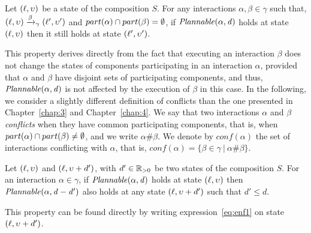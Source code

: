 \begin{property}\label{pt:plnIn1}
Let $(\ell,\upsilon)$ be a state of the composition $S$. For any interactions $\alpha,\beta\in\gamma$
such that, $(\ell,\upsilon)\xrightarrow{\beta}_{\gamma}(\ell',\upsilon')$ and $part(\alpha)\cap part(\beta)=
\emptyset$, if $\mathit{Plannable(\alpha,d)}$ holds at state $(\ell,\upsilon)$ then it still 
holds at state $(\ell',\upsilon')$.
\end{property}
This property derives directly from the fact that executing an interaction $\beta$ does 
not change the states of components participating in an interaction $\alpha$, 
provided that $\alpha$ and $\beta$ have disjoint sets of participating components, 
and thus, $\mathit{Plannable(\alpha,d)}$ is not affected by the execution of $\beta$ in this case.
In the following, we consider a slightly different definition of conflicts than the one
presented in Chapter~\ref{chap:3} and Chapter~\ref{chap:4}. 
We say that two interactions $\alpha$ and $\beta$ \emph{conflicts} when 
they have common participating components, that is, when $part(\alpha)\cap part(\beta)\neq\emptyset$, 
and we write $\alpha\#\beta$.
We denote by $conf(\alpha)$ the set of interactions conflicting with $\alpha$, that is, 
$conf(\alpha) = \{ \beta \in \gamma \ | \ \alpha\#\beta \}$.

\begin{property}\label{pt:plnIn2}
Let $(\ell,\upsilon)$ and $(\ell,\upsilon+d')$, with $d'\in\mathbb{R}_{> 0}$ be two states of 
the composition $S$. For an interaction $\alpha\in\gamma$, if $\mathit{Plannable(\alpha,d)}$ 
holds at state $(\ell,\upsilon)$ then $\mathit{Plannable(\alpha,d-d')}$ 
also holds at any state $(\ell,\upsilon+d')$ such that $d'\le d$.
\end{property}
\noindent This property can be found directly by writing expression~\ref{eq:enf1} on state 
$(\ell,\upsilon+d')$.

